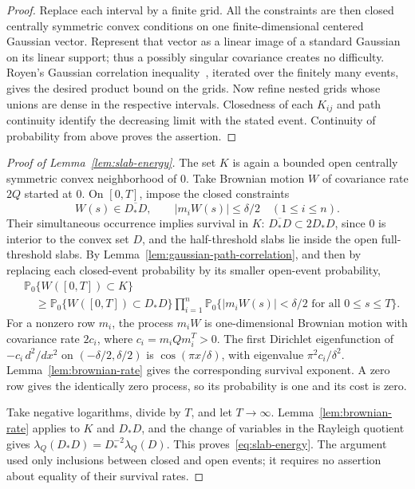 \begin{proof}
Replace each interval by a finite grid.  All the constraints are then
closed centrally symmetric convex conditions on one finite-dimensional
centered Gaussian vector.  Represent that vector as a linear image of a
standard Gaussian on its linear support; thus a possibly singular
covariance creates no difficulty.  Royen's Gaussian correlation
inequality~\cite{Royen2014}, iterated over the finitely many events,
gives the desired product bound on the grids.
Now refine nested grids whose unions are dense in the respective
intervals.  Closedness of each $K_{ij}$ and path continuity identify the
decreasing limit with the stated event.  Continuity of probability from
above proves the assertion.
\end{proof}

\begin{proof}[Proof of Lemma~\ref{lem:slab-energy}]
The set $K$ is again a bounded open centrally symmetric convex
neighborhood of $0$.  Take Brownian motion $W$ of covariance rate $2Q$
started at $0$.  On $[0,T]$, impose the closed constraints
\[
 W(s)\in\overline{D_*D},\qquad
 |m_iW(s)|\le\delta/2\quad(1\le i\le n).
\]
Their simultaneous occurrence implies survival in $K$:
$\overline{D_*D}\subset 2D_*D$, since $0$ is interior to the convex set
$D$, and the half-threshold slabs lie inside the open full-threshold
slabs.  By Lemma~\ref{lem:gaussian-path-correlation}, and then by replacing
each closed-event probability by its smaller open-event probability,
\begin{align*}
 &\mathbb P_0\{W([0,T])\subset K\}\\
 &\quad\ge
 \mathbb P_0\{W([0,T])\subset D_*D\}
 \prod_{i=1}^n
 \mathbb P_0\{|m_iW(s)|<\delta/2\text{ for all }0\le s\le T\}.
\end{align*}
For a nonzero row $m_i$, the process $m_iW$ is one-dimensional Brownian
motion with covariance rate $2c_i$, where $c_i=m_iQm_i^T>0$.
The first Dirichlet eigenfunction of $-c_i\,d^2/dx^2$ on
$(-\delta/2,\delta/2)$ is $\cos(\pi x/\delta)$, with eigenvalue
$\pi^2c_i/\delta^2$.  Lemma~\ref{lem:brownian-rate} gives the corresponding
survival exponent.  A zero row gives the identically zero process, so
its probability is one and its cost is zero.

Take negative logarithms, divide by $T$, and let $T\to\infty$.
Lemma~\ref{lem:brownian-rate} applies to $K$ and $D_*D$, and the change
of variables in the Rayleigh quotient gives
$\lambda_Q(D_*D)=D_*^{-2}\lambda_Q(D)$.
This proves~\eqref{eq:slab-energy}.
The argument used only inclusions between closed and open events; it
requires no assertion about equality of their survival rates.
\end{proof}
